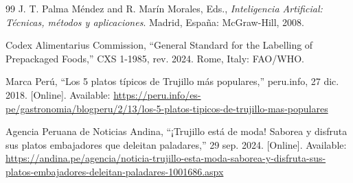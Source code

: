 \documentclass[conference]{IEEEtran}
\begin{document}
\begin{thebibliography}{99}
 J. T. Palma Méndez and R. Marín Morales, Eds., \emph{Inteligencia Artificial: Técnicas, métodos y aplicaciones}. Madrid, España: McGraw-Hill, 2008.

 Codex Alimentarius Commission, ``General Standard for the Labelling of Prepackaged Foods,'' CXS 1-1985, rev. 2024. Rome, Italy: FAO/WHO.

 Marca Perú, ``Los 5 platos típicos de Trujillo más populares,'' peru.info, 27 dic. 2018. [Online]. Available: \url{https://peru.info/es-pe/gastronomia/blogperu/2/13/los-5-platos-tipicos-de-trujillo-mas-populares}

 Agencia Peruana de Noticias Andina, ``¡Trujillo está de moda! Saborea y disfruta sus platos embajadores que deleitan paladares,'' 29 sep. 2024. [Online]. Available: \url{https://andina.pe/agencia/noticia-trujillo-esta-moda-saborea-y-disfruta-sus-platos-embajadores-deleitan-paladares-1001686.aspx}

\end{thebibliography}
\end{document}
